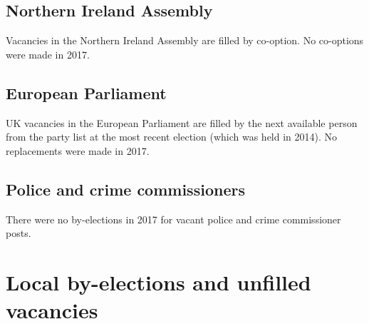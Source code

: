 \documentclass[a4paper,openany]{book}
\begin{document}
\section{Northern Ireland Assembly}

Vacancies in the Northern Ireland Assembly are filled by co-option.
No co-options were made in 2017.
%

\section{European Parliament}

UK vacancies in the European Parliament are filled by the next available person from the party list at the most recent election (which was held in 2014). 
No replacements were made in 2017.

\section{Police and crime commissioners}

There were no by-elections in 2017 for vacant police and crime commissioner posts.

\chapter{Local by-elections and unfilled vacancies}
\end{document}
